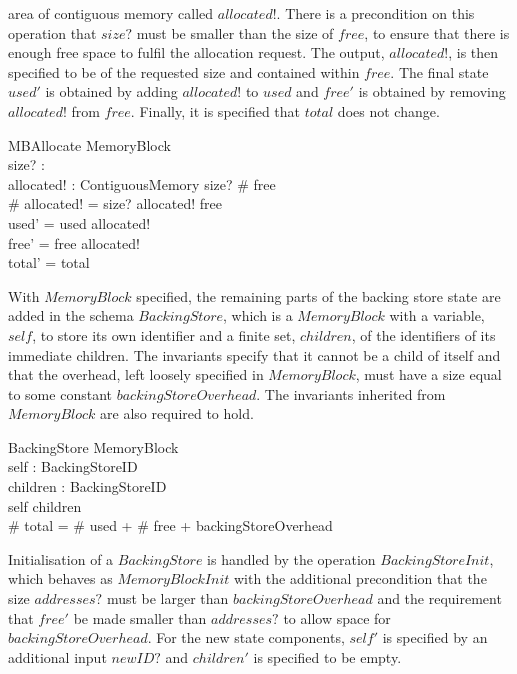 \documentclass[a4paper,10pt]{report}
\begin{document}
area of contiguous memory called $allocated!$. There is a precondition on this
operation that $size?$ must be smaller than the size of $free$, to ensure that
there is enough free space to fulfil the allocation request. The output,
$allocated!$, is then specified to be of the requested size and contained within
$free$. The final state $used'$ is obtained by adding $allocated!$ to $used$ and
$free'$ is obtained by removing $allocated!$ from $free$. Finally, it is
specified that $total$ does not change.
%
\begin{schema}{MBAllocate}
  \Delta MemoryBlock \\
  size? : \nat \\
  allocated! : ContiguousMemory
\where
  size? \leq \# free \\
  \# allocated! = size? \land allocated! \subseteq free \\
  used' = used \cup allocated! \\
  free' = free \setminus allocated! \\
  total' = total \\
\end{schema}
%
With $MemoryBlock$ specified, the remaining parts of the backing store state are
added in the schema $BackingStore$, which is a $MemoryBlock$ with a variable,
$self$, to store its own identifier and a finite set, $children$, of the
identifiers of its immediate children. The invariants specify that it cannot be
a child of itself and that the overhead, left loosely specified in
$MemoryBlock$, must have a size equal to some constant
$backingStoreOverhead$. The invariants inherited from $MemoryBlock$ are also
required to hold.
%
\begin{schema}{BackingStore}
  MemoryBlock \\
  self : BackingStoreID \\
  children : \finset BackingStoreID \\
\where
  self \notin children \\
  \# total = \# used + \# free + backingStoreOverhead
\end{schema}
%
Initialisation of a $BackingStore$ is handled by the operation
$BackingStoreInit$, which behaves as $MemoryBlockInit$ with the additional
precondition that the size $addresses?$ must be larger than
$backingStoreOverhead$ and the requirement that $free'$ be made smaller than
$addresses?$ to allow space for $backingStoreOverhead$. For the new state
components, $self'$ is specified by an additional input $newID?$ and $children'$
is specified to be empty.
\end{document}
